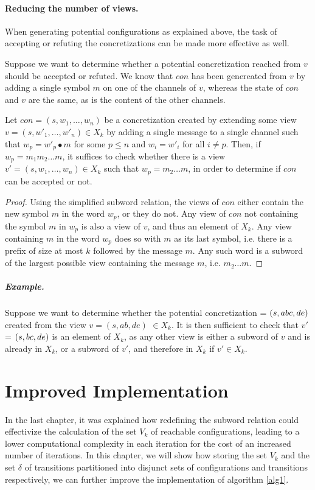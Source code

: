 \paragraph{Reducing the number of views.}
When generating potential configurations as explained above, the task of accepting or refuting the concretizations can be made more effective as well.

Suppose we want to determine whether a potential concretization  reached from $v$ should be accepted or refuted. We know that $con$ has been genereated from $v$ by adding a single symbol $m$ on one of the channels of $v$, whereas the state of $con$ and $v$ are the same, as is the content of the other channels.

\begin{lemma}
Let $con = (s, w_1, \ldots, w_n)$ be a concretization created by extending some view $v = (s, w'_1, \ldots, w'_n) \in X_k$ by adding a single message to a single channel such that $w_p = w'_p \bullet m$ for some $p\leq n$ and $w_i = w'_i$ for all $i \neq p$. Then, if $w_p = m_1 m_2 \ldots m$, it suffices to check whether there is a view $v' = (s, w_1, \ldots, w_n) \in X_k$ such that $w_p = m_2\ldots m$, in order to determine if $con$ can be accepted or not.
\end{lemma}

\begin{proof}
Using the simplified subword relation, the views of $con$ either contain the new symbol $m$ in the word $w_p$, or they do not. Any view of $con$ not containing the symbol $m$ in $w_p$ is also a view of $v$, and thus an element of $X_k$. Any view containing $m$ in the word $w_p$ does so with $m$ as its last symbol, i.e. there is a prefix of size at most $k$ followed by the message $m$. Any such word is a subword of the largest possible view containing the message $m$, i.e. $m_2\ldots m$.

\end{proof}


\subparagraph{Example.} Suppose we want to determine whether the potential concretization  = $(s, abc, de)$ created from the view $v = (s, ab, de)$ $\in X_k$. It is then sufficient to check that $v'$ = $(s,bc,de)$ is an element of $X_k$, as any other view is either a subword of $v$ and is already in $X_k$, or a subword of $v'$, and therefore in $X_k$ if $v' \in X_k$.

\newpage
\section{Improved Implementation}
In the last chapter, it was explained how redefining the subword relation could effectivize the calculation of the set $V_k$ of reachable configurations, leading to a lower computational complexity in each iteration for the cost of an increased number of iterations. In this chapter, we will show how storing the set $V_k$ and the set $\delta$ of transitions partitioned into disjunct sets of configurations and transitions respectively, we can further improve the implementation of algorithm \ref{alg1}.

